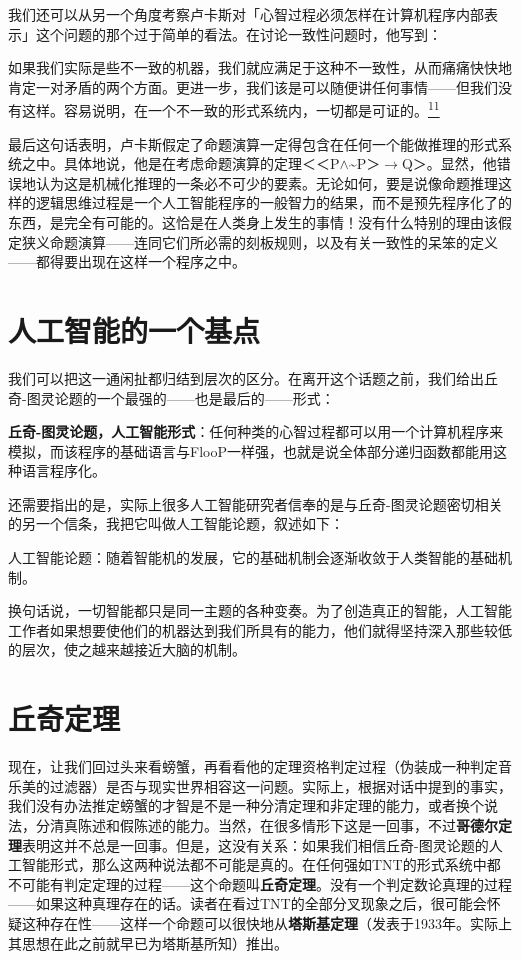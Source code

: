 \documentclass[
  12pt,
  twoside,
  openright,
  oldfontcommands,
]{memoir}
\newcommand{\heititext}[1]{{\heifamily\bfseries #1}}
\newenvironment{fsquote}{%
  \begin{mdframed}[style=gebquote]\kaitifamily\small%
}{%
  \end{mdframed}%
}
\begin{document}
我们还可以从另一个角度考察卢卡斯对「心智过程必须怎样在计算机程序内部表示」这个问题的那个过于简单的看法。在讨论一致性问题时，他写到：

\begin{fsquote}
如果我们实际是些不一致的机器，我们就应满足于这种不一致性，从而痛痛快快地肯定一对矛盾的两个方面。更进一步，我们该是可以随便讲任何事情------但我们没有这样。容易说明，在一个不一致的形式系统内，一切都是可证的。\hyperref[fn:Chapter17-11]{\textsuperscript{11}}
\end{fsquote}

最后这句话表明，卢卡斯假定了命题演算一定得包含在任何一个能做推理的形式系统之中。具体地说，他是在考虑命题演算的定理＜＜P$\wedge$\textasciitilde P＞$\rightarrow$Q＞。显然，他错误地认为这是机械化推理的一条必不可少的要素。无论如何，要是说像命题推理这样的逻辑思维过程是一个人工智能程序的一般智力的结果，而不是预先程序化了的东西，是完全有可能的。这恰是在人类身上发生的事情！没有什么特别的理由该假定狭义命题演算------连同它们所必需的刻板规则，以及有关一致性的呆笨的定义------都得要出现在这样一个程序之中。

\section{人工智能的一个基点}

我们可以把这一通闲扯都归结到层次的区分。在离开这个话题之前，我们给出丘奇-图灵论题的一个最强的------也是最后的------形式：

\heititext{丘奇-图灵论题，人工智能形式}：任何种类的心智过程都可以用一个计算机程序来模拟，而该程序的基础语言与FlooP一样强，也就是说全体部分递归函数都能用这种语言程序化。

还需要指出的是，实际上很多人工智能研究者信奉的是与丘奇-图灵论题密切相关的另一个信条，我把它叫做人工智能论题，叙述如下：

人工智能论题：随着智能机的发展，它的基础机制会逐渐收敛于人类智能的基础机制。

换句话说，一切智能都只是同一主题的各种变奏。为了创造真正的智能，人工智能工作者如果想要使他们的机器达到我们所具有的能力，他们就得坚持深入那些较低的层次，使之越来越接近大脑的机制。

\section{丘奇定理}

现在，让我们回过头来看螃蟹，再看看他的定理资格判定过程（伪装成一种判定音乐美的过滤器）是否与现实世界相容这一问题。实际上，根据对话中提到的事实，我们没有办法推定螃蟹的才智是不是一种分清定理和非定理的能力，或者换个说法，分清真陈述和假陈述的能力。当然，在很多情形下这是一回事，不过\heititext{哥德尔定理}表明这并不总是一回事。但是，这没有关系：如果我们相信丘奇-图灵论题的人工智能形式，那么这两种说法都不可能是真的。在任何强如TNT的形式系统中都不可能有判定定理的过程------这个命题叫\heititext{丘奇定理}。没有一个判定数论真理的过程------如果这种真理存在的话。读者在看过TNT的全部分叉现象之后，很可能会怀疑这种存在性------这样一个命题可以很快地从\heititext{塔斯基定理}（发表于1933年。实际上其思想在此之前就早已为塔斯基所知）推出。
\end{document}
